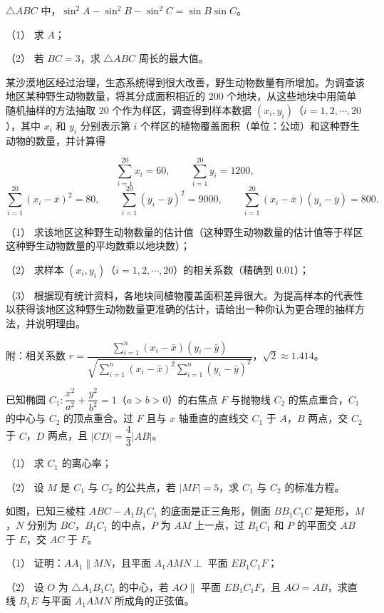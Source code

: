 \begin{question}
$\triangle ABC$ 中，$\sin^2A-\sin^2B-\sin^2C=\sin B\sin C$。

（1） 求 $A$；

（2） 若 $BC=3$，求 $\triangle ABC$ 周长的最大值。

\end{question}
\begin{question}
某沙漠地区经过治理，生态系统得到很大改善，野生动物数量有所增加。为调查该地区某种野生动物数量，将其分成面积相近的 $200$ 个地块，从这些地块中用简单随机抽样的方法抽取 $20$ 个作为样区，调查得到样本数据 $(x_i,y_i)$（$i=1,2,\cdots,20$），其中 $x_i$ 和 $y_i$ 分别表示第 $i$ 个样区的植物覆盖面积（单位：公顷）和这种野生动物的数量，并计算得

\nopagebreak[4]
\[\sum_{i=1}^{20}x_i=60,\qquad \sum_{i=1}^{20}y_i=1200,\]
\nopagebreak[4]
\[\sum_{i=1}^{20}(x_i-\bar x)^2=80,\qquad \sum_{i=1}^{20}(y_i-\bar y)^2=9000,\qquad \sum_{i=1}^{20}(x_i-\bar x)(y_i-\bar y)=800.\]

（1） 求该地区这种野生动物数量的估计值（这种野生动物数量的估计值等于样区这种野生动物数量的平均数乘以地块数）；

（2） 求样本 $(x_i,y_i)$（$i=1,2,\cdots,20$）的相关系数（精确到 $0.01$）；

（3） 根据现有统计资料，各地块间植物覆盖面积差异很大。为提高样本的代表性以获得该地区这种野生动物数量更准确的估计，请给出一种你认为更合理的抽样方法，并说明理由。

附：相关系数 $r=\dfrac{\sum\limits_{i=1}^n(x_i-\bar x)(y_i-\bar y)}{\sqrt{\sum\limits_{i=1}^n(x_i-\bar x)^2\sum\limits_{i=1}^n(y_i-\bar y)^2}}$，$\sqrt2\approx1.414$。

\end{question}
\begin{question}
已知椭圆 $C_1:\dfrac{x^2}{a^2}+\dfrac{y^2}{b^2}=1$（$a>b>0$）的右焦点 $F$ 与抛物线 $C_2$ 的焦点重合，$C_1$ 的中心与 $C_2$ 的顶点重合。过 $F$ 且与 $x$ 轴垂直的直线交 $C_1$ 于 $A$，$B$ 两点，交 $C_2$ 于 $C$，$D$ 两点，且 $|CD|=\dfrac43|AB|$。

（1） 求 $C_1$ 的离心率；

（2） 设 $M$ 是 $C_1$ 与 $C_2$ 的公共点，若 $|MF|=5$，求 $C_1$ 与 $C_2$ 的标准方程。

\Needspace{0.4\textheight}
\end{question}
\begin{question}
如图，已知三棱柱 $ABC-A_1B_1C_1$ 的底面是正三角形，侧面 $BB_1C_1C$ 是矩形，$M$，$N$ 分别为 $BC$，$B_1C_1$ 的中点，$P$ 为 $AM$ 上一点，过 $B_1C_1$ 和 $P$ 的平面交 $AB$ 于 $E$，交 $AC$ 于 $F$。

（1） 证明：$AA_1\parallel MN$，且平面 $A_1AMN\perp$ 平面 $EB_1C_1F$；

（2） 设 $O$ 为 $\triangle A_1B_1C_1$ 的中心，若 $AO\parallel$ 平面 $EB_1C_1F$，且 $AO=AB$，求直线 $B_1E$ 与平面 $A_1AMN$ 所成角的正弦值。
\nopagebreak[4]
\begin{center}\end{center}
\nopagebreak[4]
\end{question}
